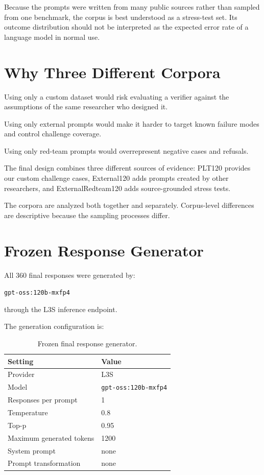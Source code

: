 Because the prompts were written from many public sources rather than sampled from one benchmark, the corpus is best understood as a stress-test set. Its outcome distribution should not be interpreted as the expected error rate of a language model in normal use.
\section{Why Three Different Corpora}

Using only a custom dataset would risk evaluating a verifier against the assumptions of the same researcher who designed it.

Using only external prompts would make it harder to target known failure modes and control challenge coverage.

Using only red-team prompts would overrepresent negative cases and refusals.

The final design combines three different sources of evidence: PLT120 provides our custom challenge cases, External120 adds prompts created by other researchers, and ExternalRedteam120 adds source-grounded stress tests.

The corpora are analyzed both together and separately. Corpus-level differences are descriptive because the sampling processes differ.

\section{Frozen Response Generator}

All 360 final responses were generated by:

\begin{center}
\texttt{gpt-oss:120b-mxfp4}
\end{center}

through the L3S inference endpoint.

The generation configuration is:

\begin{table}[ht]
\centering
\caption{Frozen final response generator.}
\label{tab:generator-config}
\begin{tabular}{l l}
\toprule
Setting & Value \\
\midrule
Provider & L3S \\
Model & \texttt{gpt-oss:120b-mxfp4} \\
Responses per prompt & 1 \\
Temperature & 0.8 \\
Top-p & 0.95 \\
Maximum generated tokens & 1200 \\
System prompt & none \\
Prompt transformation & none \\
\bottomrule
\end{tabular}
\end{table}

